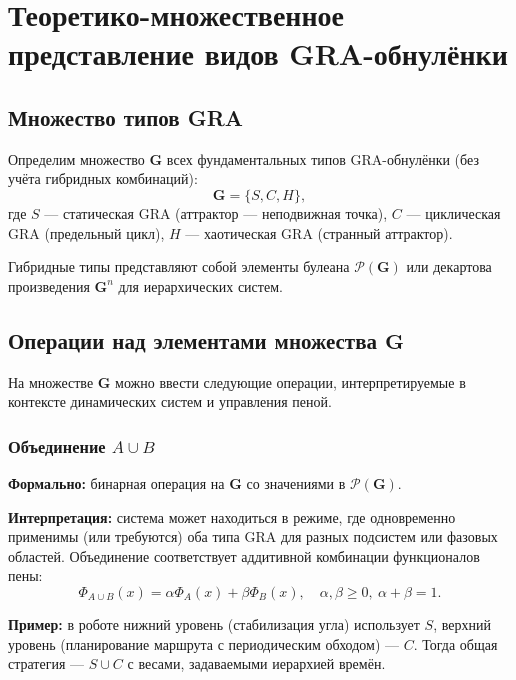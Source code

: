 \documentclass[12pt,a4paper]{article}
\newcommand{\G}{\mathbf{G}}
\newcommand{\Pset}{\mathcal{P}}
\begin{document}
\newpage

\section{Теоретико-множественное представление видов GRA-обнулёнки}
\label{sec:set}

\subsection{Множество типов GRA}

Определим множество $\G$ всех фундаментальных типов GRA-обнулёнки (без учёта гибридных комбинаций):
\begin{equation}
    \G = \{ S, C, H \},
\end{equation}
где $S$ — статическая GRA (аттрактор — неподвижная точка), $C$ — циклическая GRA (предельный цикл), $H$ — хаотическая GRA (странный аттрактор).

Гибридные типы представляют собой элементы булеана $\Pset(\G)$ или декартова произведения $\G^n$ для иерархических систем.

\subsection{Операции над элементами множества $\G$}

На множестве $\G$ можно ввести следующие операции, интерпретируемые в контексте динамических систем и управления пеной.

\subsubsection{Объединение $A \cup B$}

\textbf{Формально:} бинарная операция на $\G$ со значениями в $\Pset(\G)$.

\textbf{Интерпретация:} система может находиться в режиме, где одновременно применимы (или требуются) оба типа GRA для разных подсистем или фазовых областей. Объединение соответствует аддитивной комбинации функционалов пены:
\begin{equation}
    \Phi_{A \cup B}(x) = \alpha \Phi_A(x) + \beta \Phi_B(x), \quad \alpha,\beta \geq 0,\ \alpha+\beta=1.
\end{equation}

\textbf{Пример:} в роботе нижний уровень (стабилизация угла) использует $S$, верхний уровень (планирование маршрута с периодическим обходом) — $C$. Тогда общая стратегия — $S \cup C$ с весами, задаваемыми иерархией времён.
\end{document}

